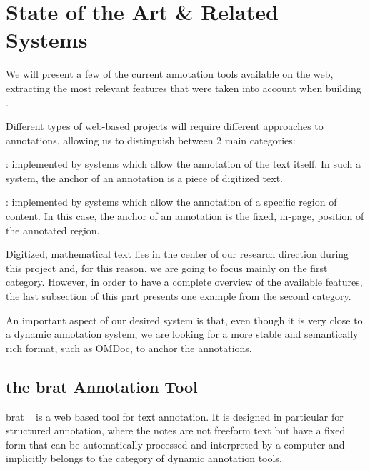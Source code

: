 \section{State of the Art \& Related Systems}
We will present a few of the current annotation tools available on the web, extracting the
most relevant features that were taken into account when building \KAT.

Different types of web-based projects will require different approaches to annotations,
allowing us to distinguish between 2 main categories:
\begin{compactenum}
\item {}: implemented by systems which allow the annotation of
  the text itself. In such a system, the anchor of an annotation is a piece of digitized
  text.
\item {}: implemented by systems which allow the annotation of a
  specific region of content. In this case, the anchor of an annotation is the fixed,
  in-page, position of the annotated region.
\end{compactenum}
Digitized, mathematical text lies in the center of our research direction during this
project and, for this reason, we are going to focus mainly on the first category. However,
in order to have a complete overview of the available features, the last subsection of
this part presents one example from the second category.

An important aspect of our desired system is that, even though it is very close to a
dynamic annotation system, we are looking for a more stable and semantically rich format,
such as \textsf{OMDoc}, to anchor the annotations.

\subsection{the brat Annotation Tool}

brat  ~\cite  {brat:on} is a web based tool for text annotation. It is designed in particular
for structured annotation, where the notes are not freeform text but have a fixed form
that can be automatically processed and interpreted by a computer and implicitly belongs
to the category of dynamic annotation tools.

